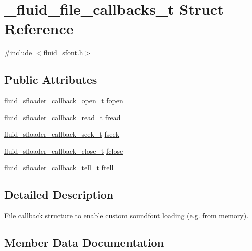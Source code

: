 \hypertarget{struct__fluid__file__callbacks__t}{}\section{\+\_\+fluid\+\_\+file\+\_\+callbacks\+\_\+t Struct Reference}
\label{struct__fluid__file__callbacks__t}


{\ttfamily \#include $<$fluid\+\_\+sfont.\+h$>$}

\subsection*{Public Attributes}
\begin{DoxyCompactItemize}
\item 
\hyperlink{sfont_8h_a801d39d1437ad9f41caec35a1e79094e}{fluid\+\_\+sfloader\+\_\+callback\+\_\+open\+\_\+t} \hyperlink{struct__fluid__file__callbacks__t_a209009deac020dbb99775951d31156b2}{fopen}
\item 
\hyperlink{sfont_8h_a5ad574cbab9c9413932d51faaa5d10a8}{fluid\+\_\+sfloader\+\_\+callback\+\_\+read\+\_\+t} \hyperlink{struct__fluid__file__callbacks__t_afa89d165fc9fab2e1e484a33cfb4411b}{fread}
\item 
\hyperlink{sfont_8h_ac5cf57119fee0cde7422c86beafe0917}{fluid\+\_\+sfloader\+\_\+callback\+\_\+seek\+\_\+t} \hyperlink{struct__fluid__file__callbacks__t_a23fe39b2c888b5fa6b87cd8c426f95d9}{fseek}
\item 
\hyperlink{sfont_8h_a1227398bb99d8b74b99a5fef6c62d3a8}{fluid\+\_\+sfloader\+\_\+callback\+\_\+close\+\_\+t} \hyperlink{struct__fluid__file__callbacks__t_acedc1f0c5dbd2da1ad8034a795f51135}{fclose}
\item 
\hyperlink{sfont_8h_a1b7f13d61330ca5a3441cf6c15863607}{fluid\+\_\+sfloader\+\_\+callback\+\_\+tell\+\_\+t} \hyperlink{struct__fluid__file__callbacks__t_ac6369333c624eda55ecb70eae31af31e}{ftell}
\end{DoxyCompactItemize}


\subsection{Detailed Description}
File callback structure to enable custom soundfont loading (e.\+g. from memory). 

\subsection{Member Data Documentation}
\mbox{\label{struct__fluid__file__callbacks__t_acedc1f0c5dbd2da1ad8034a795f51135}} 

